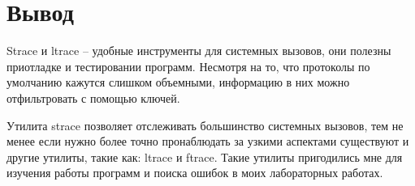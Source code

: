 \documentclass[pdf, unicode, 12pt, a4paper,oneside,fleqn]{article}
\begin{document}
\pagebreak

\section{Вывод}

Strace и ltrace \--- удобные инструменты для системных вызовов, они полезны приотладке и тестировании программ.
Несмотря на то, что протоколы по умолчанию кажутся слишком объемными, информацию в 
них можно отфильтровать с помощью ключей.

Утилита strace позволяет отслеживать большинство системных вызовов, тем не менее если нужно
более точно пронаблюдать за узкими аспектами существуют и другие утилиты, такие как:
ltrace и ftrace. Такие утилиты пригодились мне для изучения работы программ и поиска ошибок в моих лабораторных работах.
\end{document}
